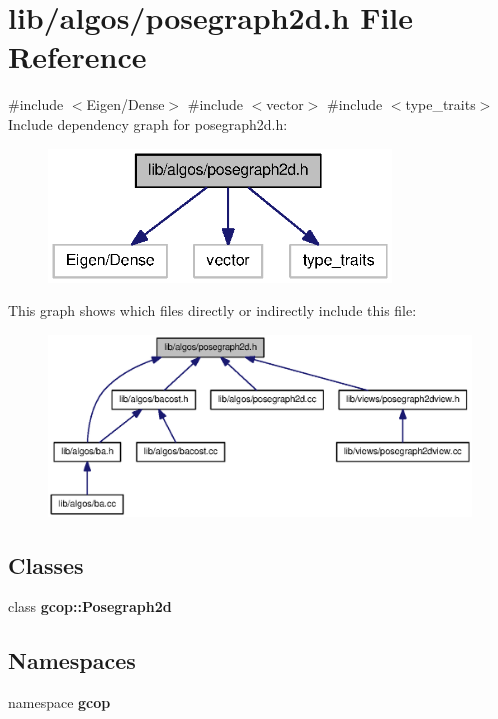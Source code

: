 \section{lib/algos/posegraph2d.h \-File \-Reference}
\label{posegraph2d_8h}
{\ttfamily \#include $<$\-Eigen/\-Dense$>$}\*
{\ttfamily \#include $<$vector$>$}\*
{\ttfamily \#include $<$type\-\_\-traits$>$}\*
\-Include dependency graph for posegraph2d.\-h\-:\nopagebreak
\begin{figure}[H]
\begin{center}
\leavevmode
\includegraphics[width=258pt]{posegraph2d_8h__incl}
\end{center}
\end{figure}
\-This graph shows which files directly or indirectly include this file\-:\nopagebreak
\begin{figure}[H]
\begin{center}
\leavevmode
\includegraphics[width=350pt]{posegraph2d_8h__dep__incl}
\end{center}
\end{figure}
\subsection*{\-Classes}
\begin{DoxyCompactItemize}
\item 
class {\bf gcop\-::\-Posegraph2d}
\end{DoxyCompactItemize}
\subsection*{\-Namespaces}
\begin{DoxyCompactItemize}
\item 
namespace {\bf gcop}
\end{DoxyCompactItemize}
